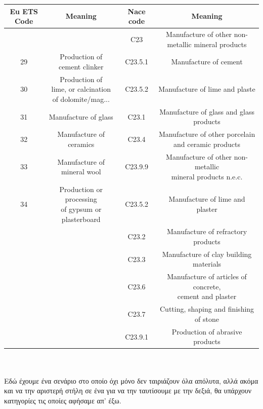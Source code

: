 \documentclass[a4paper,twoside,10pt]{article}
\begin{document}
\begin{tabular}{|c|c|c|c|}
	\hline
	Eu ETS Code & Meaning & Nace code & Meaning \\
	\hline
	&  & C23 & Manufacture of other non-metallic mineral products \\
	\hline
	29 & \makecell{Production of\\cement clinker} & C23.5.1  & Manufacture of cement \\
	\hline
	30 & \makecell{Production of\\ lime, or calcination\\ of dolomite/mag...} & C23.5.2 & Manufacture of lime and plaste \\
	\hline
	31 & Manufacture of glass & C23.1 & Manufacture of glass and glass products \\
	\hline
	32 & Manufacture of ceramics & C23.4 & Manufacture of other porcelain and ceramic products \\
	\hline
	33 & Manufacture of mineral wool & C23.9.9 & \makecell{Manufacture of other non-metallic\\ mineral products n.e.c.} \\
	\hline
	34 & \makecell{Production or processing\\ of gypsum or plasterboard} & C23.5.2 & Manufacture of lime and plaster \\
	\hline
	&  & C23.2 & Manufacture of refractory products \\
	\hline
	&  & C23.3 & Manufacture of clay building materials \\
	\hline
	&  & C23.6 &\makecell{ Manufacture of articles of concrete,\\ cement and plaster} \\
	\hline
	&  & C23.7 & Cutting, shaping and finishing of stone \\
	\hline
	&  & C23.9.1 & Production of abrasive products \\
	\hline
\end{tabular} \\  \\
Εδώ έχουμε ένα σενάριο στο οποίο όχι μόνο δεν ταιριάζουν όλα απόλυτα, αλλά ακόμα και να την αριστερή στήλη σε ένα για να την ταυτίσουμε με την δεξιά, θα υπάρχουν κατηγορίες τις οποίες αφήσαμε απ' έξω.
\end{document}
